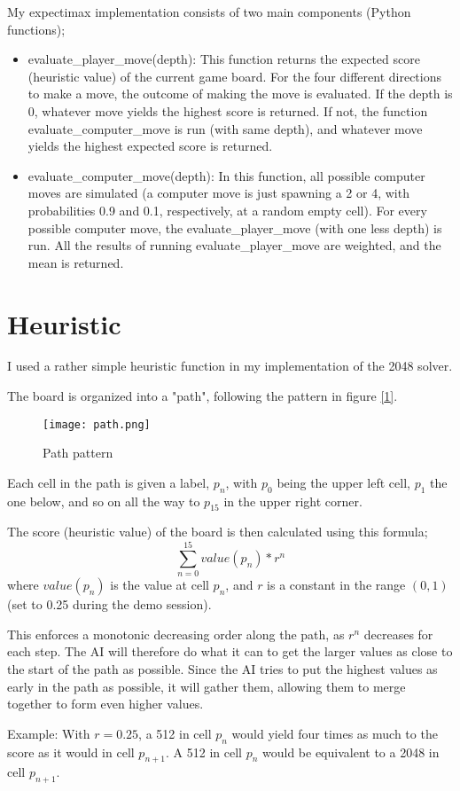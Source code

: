\documentclass{article}
\begin{document}
My expectimax implementation consists of two main components (Python functions);
\begin{itemize}
    \item evaluate\_player\_move(depth): This function returns the expected score (heuristic value) of the current game board. For the four different directions to make a move, the outcome of making the move is evaluated. If the depth is 0, whatever move yields the highest score is returned. If not, the function evaluate\_computer\_move is run (with same depth), and whatever move yields the highest expected score is returned.
    \item evaluate\_computer\_move(depth): In this function, all possible computer moves are simulated (a computer move is just spawning a 2 or 4, with probabilities 0.9 and 0.1, respectively, at a random empty cell). For every possible computer move, the evaluate\_player\_move (with one less depth) is run. All the results of running evaluate\_player\_move are weighted, and the mean is returned.
\end{itemize}

\section{Heuristic}
I used a rather simple heuristic function in my implementation of the 2048 solver.

The board is organized into a "path", following the pattern in figure \hyperref[fig:path]{[\ref*{fig:path}]}.
\begin{figure}[H]
	\centering	
	\texttt{[image: path.png]}
	\caption{Path pattern}
	\label{fig:path}
\end{figure}
Each cell in the path is given a label, $p_n$, with $p_0$ being the upper left cell, $p_1$ the one below, and so on all the way to $p_{15}$ in the upper right corner.

The score (heuristic value) of the board is then calculated using this formula;
\begin{equation}
	\sum\limits_{n=0}^{15}value(p_n)*r^n
\end{equation}
where $value(p_n)$ is the value at cell $p_n$, and $r$ is a constant in the range $(0, 1)$ (set to 0.25 during the demo session).

This enforces a monotonic decreasing order along the path, as $r^n$ decreases for each step. The AI will therefore do what it can to get the larger values as close to the start of the path as possible. Since the AI tries to put the highest values as early in the path as possible, it will gather them, allowing them to merge together to form even higher values.

Example: With $r=0.25$, a 512 in cell $p_n$ would yield four times as much to the score as it would in cell $p_{n+1}$. A 512 in cell $p_n$ would be equivalent to a 2048 in cell $p_{n+1}$.

\end{document}
